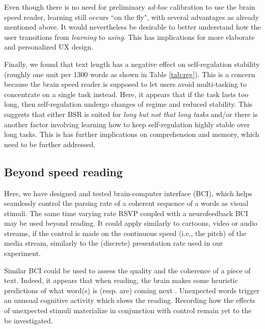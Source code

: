 Even though there is no need for preliminary {\it ad-hoc} calibration to use the brain speed reader, learning still occurs ``on the fly", with several advantages as already mentioned above. It would nevertheless be desirable to better understand how the user transitions from {\it learning} to {\it using}. This has implications for more elaborate and personalized UX design.

Finally, we found that text length has a negative effect on self-regulation stability (roughly one unit per 1300 words as shown in Table \ref{tab:reg}). This is a concern because the brain speed reader is supposed to let users avoid multi-tasking to concentrate on a single task instead. Here, it appears that if the task lasts too long, then self-regulation undergo changes of regime and reduced stability. This suggests that either BSR is suited for {\it long but not that long tasks} and/or there is another factor involving learning how to keep self-regulation highly stable over long tasks. This is has further implications on comprehension and memory, which need to be further addressed.

\subsection{Beyond speed reading}
Here, we have designed and tested brain-computer interface (BCI), which helps seamlessly control the parsing rate of a coherent sequence of a words as visual stimuli. The same time varying rate RSVP coupled with a neurofeedback BCI may be used beyond reading. It could apply similarly to cartoons, video or audio streams, if the control is made on the continuous speed (i.e., the pitch) of the media stream, similarly to the (discrete) presentation rate used in our experiment.

Similar BCI could be used to assess the quality and the coherence of a piece of text. Indeed, it appears that when reading, the brain makes some heuristic predictions of what word(s) is (resp. are) coming next \cite{smith2013effect}. Unexpected words trigger an unusual cognitive activity which slows the reading. Recording how the effects of unexpected stimuli materialize in conjunction with control remain yet to the be investigated. 
